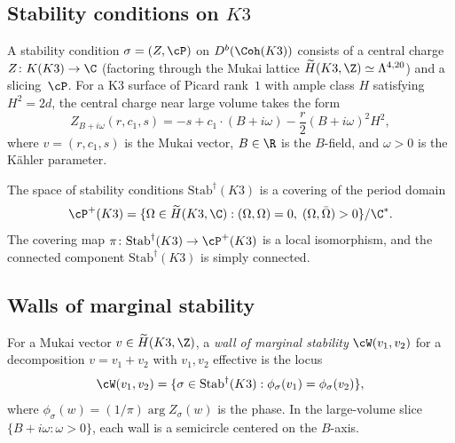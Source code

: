 \subsection{Stability conditions on \texorpdfstring{$K3$}{K3}}
\label{subsec:k3e-bridgeland}

\begin{definition}
\label{def:k3e-bridgeland}
A stability condition $\sigma = (Z, \cP)$ on $D^b(\Coh(K3))$ consists of a central charge $Z \colon K(K3) \to \C$ (factoring through the Mukai lattice $\widetilde{H}(K3, \Z) \simeq \Lambda^{4,20}$) and a slicing~$\cP$. For a K3 surface of Picard rank~$1$ with ample class $H$ satisfying $H^2 = 2d$, the central charge near large volume takes the form
\[
 Z_{B + i\omega}(r, c_1, s) = -s + c_1 \cdot (B + i\omega) - \frac{r}{2}(B + i\omega)^2 H^2,
\]
where $v = (r, c_1, s)$ is the Mukai vector, $B \in \R$ is the $B$-field, and $\omega > 0$ is the K\"ahler parameter.
\end{definition}

\begin{theorem}[Bridgeland 2008]
\label{thm:bridgeland-k3}
The space of stability conditions $\mathrm{Stab}^\dagger(K3)$ is a covering of the period domain
\[
 \cP^+(K3) = \{ \Omega \in \widetilde{H}(K3, \C) : (\Omega, \Omega) = 0, \; (\Omega, \bar{\Omega}) > 0 \} / \C^*.
\]
The covering map $\pi \colon \mathrm{Stab}^\dagger(K3) \to \cP^+(K3)$ is a local isomorphism, and the connected component $\mathrm{Stab}^\dagger(K3)$ is simply connected.
\end{theorem}

\subsection{Walls of marginal stability}
\label{subsec:k3e-walls}

\begin{definition}[Walls]
\label{def:k3e-walls}
For a Mukai vector $v \in \widetilde{H}(K3, \Z)$, a \emph{wall of marginal stability} $\cW(v_1, v_2)$ for a decomposition $v = v_1 + v_2$ with $v_1, v_2$ effective is the locus
\[
 \cW(v_1, v_2) = \{ \sigma \in \mathrm{Stab}^\dagger(K3) : \phi_\sigma(v_1) = \phi_\sigma(v_2) \},
\]
where $\phi_\sigma(w) = (1/\pi) \arg Z_\sigma(w)$ is the phase. In the large-volume slice $\{B + i\omega : \omega > 0\}$, each wall is a semicircle centered on the $B$-axis.
\end{definition}

